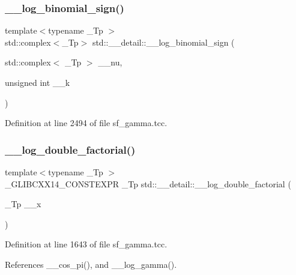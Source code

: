 \subsubsection{\texorpdfstring{\+\_\+\+\_\+log\+\_\+binomial\+\_\+sign()}{\_\_log\_binomial\_sign()}\hspace{0.1cm}{\footnotesize\ttfamily [2/2]}}
{\footnotesize\ttfamily template$<$typename \+\_\+\+Tp $>$ \\
std\+::complex$<$\+\_\+\+Tp$>$ std\+::\+\_\+\+\_\+detail\+::\+\_\+\+\_\+log\+\_\+binomial\+\_\+sign (\begin{DoxyParamCaption}\item[{std\+::complex$<$ \+\_\+\+Tp $>$}]{\+\_\+\+\_\+nu,  }\item[{unsigned int}]{\+\_\+\+\_\+k }\end{DoxyParamCaption})}



Definition at line 2494 of file sf\+\_\+gamma.\+tcc.

\mbox{\label{namespacestd_1_1____detail_a0de46e790512550b535bdda97e11e1b5}} 
\subsubsection{\texorpdfstring{\+\_\+\+\_\+log\+\_\+double\+\_\+factorial()}{\_\_log\_double\_factorial()}\hspace{0.1cm}{\footnotesize\ttfamily [1/2]}}
{\footnotesize\ttfamily template$<$typename \+\_\+\+Tp $>$ \\
\+\_\+\+G\+L\+I\+B\+C\+X\+X14\+\_\+\+C\+O\+N\+S\+T\+E\+X\+PR \+\_\+\+Tp std\+::\+\_\+\+\_\+detail\+::\+\_\+\+\_\+log\+\_\+double\+\_\+factorial (\begin{DoxyParamCaption}\item[{\+\_\+\+Tp}]{\+\_\+\+\_\+x }\end{DoxyParamCaption})}



Definition at line 1643 of file sf\+\_\+gamma.\+tcc.



References \+\_\+\+\_\+cos\+\_\+pi(), and \+\_\+\+\_\+log\+\_\+gamma().



